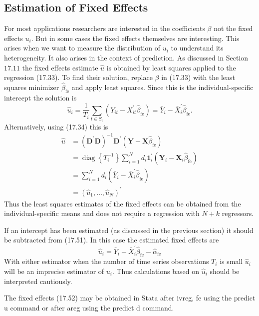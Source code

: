 \documentclass[10pt]{article}
\begin{document}
\subsection{Estimation of Fixed Effects}
For most applications researchers are interested in the coefficients $\beta$ not the fixed effects $u_{i}$. But in some cases the fixed effects themselves are interesting. This arises when we want to measure the distribution of $u_{i}$ to understand its heterogeneity. It also arises in the context of prediction. As discussed in Section $17.11$ the fixed effects estimate $\widehat{u}$ is obtained by least squares applied to the regression (17.33). To find their solution, replace $\beta$ in (17.33) with the least squares minimizer $\widehat{\beta}_{\mathrm{fe}}$ and apply least squares. Since this is the individual-specific intercept the solution is
$$
\widehat{u}_{i}=\frac{1}{T_{i}} \sum_{t \in S_{i}}\left(Y_{i t}-X_{i t}^{\prime} \widehat{\beta}_{\mathrm{fe}}\right)=\bar{Y}_{i}-\bar{X}_{i}^{\prime} \widehat{\beta}_{\mathrm{fe}} .
$$
Alternatively, using (17.34) this is
$$
\begin{aligned}
\widehat{u} &=\left(\boldsymbol{D}^{\prime} \boldsymbol{D}\right)^{-1} \boldsymbol{D}^{\prime}\left(\boldsymbol{Y}-\boldsymbol{X} \widehat{\beta}_{\mathrm{fe}}\right) \\
&=\operatorname{diag}\left\{T_{i}^{-1}\right\} \sum_{i=1}^{N} d_{i} \mathbf{1}_{i}^{\prime}\left(\boldsymbol{Y}_{i}-\boldsymbol{X}_{i} \widehat{\beta}_{\mathrm{fe}}\right) \\
&=\sum_{i=1}^{N} d_{i}\left(\bar{Y}_{i}-\bar{X}_{i}^{\prime} \widehat{\beta}_{\mathrm{fe}}\right) \\
&=\left(\widehat{u}_{1}, \ldots, \widehat{u}_{N}\right)^{\prime}
\end{aligned}
$$
Thus the least squares estimates of the fixed effects can be obtained from the individual-specific means and does not require a regression with $N+k$ regressors.

If an intercept has been estimated (as discussed in the previous section) it should be subtracted from (17.51). In this case the estimated fixed effects are
$$
\widehat{u}_{i}=\bar{Y}_{i}-\bar{X}_{i}^{\prime} \widehat{\beta}_{\mathrm{fe}}-\widehat{\alpha}_{\mathrm{fe}}
$$
With either estimator when the number of time series observations $T_{i}$ is small $\widehat{u}_{i}$ will be an imprecise estimator of $u_{i}$. Thus calculations based on $\widehat{u}_{i}$ should be interpreted cautiously.

The fixed effects (17.52) may be obtained in Stata after ivreg, fe using the predict u command or after areg using the predict d command.
\end{document}
